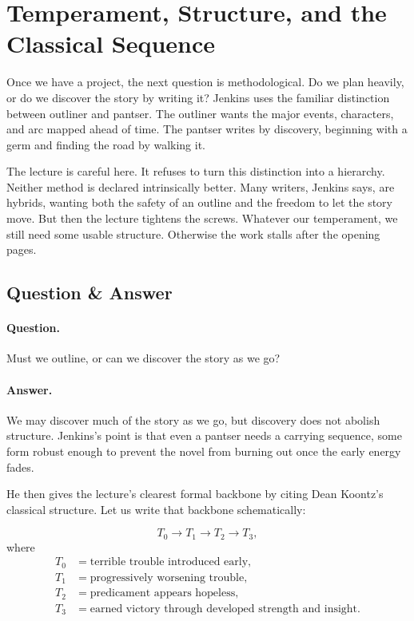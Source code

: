 \section{Temperament, Structure, and the Classical Sequence}

Once we have a project, the next question is methodological. Do we plan heavily, or do we discover the story by writing it? Jenkins uses the familiar distinction between outliner and pantser. The outliner wants the major events, characters, and arc mapped ahead of time. The pantser writes by discovery, beginning with a germ and finding the road by walking it.

The lecture is careful here. It refuses to turn this distinction into a hierarchy. Neither method is declared intrinsically better. Many writers, Jenkins says, are hybrids, wanting both the safety of an outline and the freedom to let the story move. But then the lecture tightens the screws. Whatever our temperament, we still need some usable structure. Otherwise the work stalls after the opening pages.

\subsection{Question \& Answer}

\paragraph{Question.} Must we outline, or can we discover the story as we go?

\paragraph{Answer.} We may discover much of the story as we go, but discovery does not abolish structure. Jenkins's point is that even a pantser needs a carrying sequence, some form robust enough to prevent the novel from burning out once the early energy fades.

He then gives the lecture's clearest formal backbone by citing Dean Koontz's classical structure. Let us write that backbone schematically:

\begin{equation}
T_0 \to T_1 \to T_2 \to T_3,
\end{equation}
where
\begin{align}
T_0&=\text{terrible trouble introduced early},\\
T_1&=\text{progressively worsening trouble},\\
T_2&=\text{predicament appears hopeless},\\
T_3&=\text{earned victory through developed strength and insight}.
\end{align}

